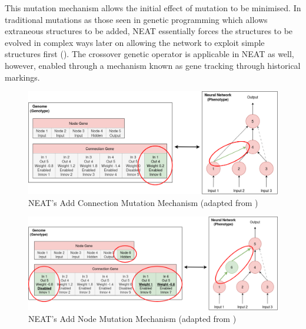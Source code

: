 \parbreak\noindent This mutation mechanism allows the initial effect of mutation to be minimised. In traditional mutations as those seen in genetic programming which allows extraneous structures to be added, NEAT essentially forces the structures to be evolved in complex ways later on allowing the network to exploit simple structures first (\cite{stanley2002evolving}). The crossover genetic operator is applicable in NEAT as well, however, enabled through a mechanism known as gene tracking through historical markings.

\parbreak
\begin{figure}[H] %
	\centering %
	\includegraphics[width=\textwidth]{Figures/chapter_ne/ne_add_connection.png} %
	\caption{NEAT's Add Connection Mutation Mechanism (adapted from \cite{stanley2002evolving})}
	\label{fig:neat_add_connection} %
\end{figure}

\parbreak
\begin{figure}[H] %
	\centering %
	\includegraphics[width=\textwidth]{Figures/chapter_ne/ne_add_node.png} %
	\caption{NEAT's Add Node Mutation Mechanism (adapted from \cite{stanley2002evolving})}
	\label{fig:neat_add_node} %
\end{figure}

